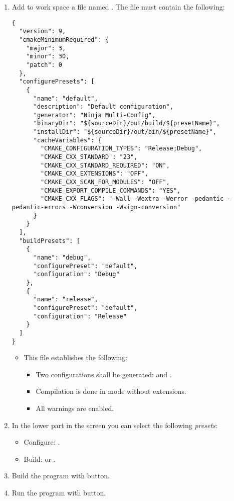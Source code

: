 \begin{enumerate}
\item
Add to work space a file named
. 
The file must contain the following:

\begin{lstlisting}
{
  "version": 9,
  "cmakeMinimumRequired": {
    "major": 3,
    "minor": 30,
    "patch": 0
  },
  "configurePresets": [
    {
      "name": "default",
      "description": "Default configuration",
      "generator": "Ninja Multi-Config",
      "binaryDir": "${sourceDir}/out/build/${presetName}",
      "installDir": "${sourceDir}/out/bin/${presetName}",
      "cacheVariables": {
        "CMAKE_CONFIGURATION_TYPES": "Release;Debug",
        "CMAKE_CXX_STANDARD": "23",
        "CMAKE_CXX_STANDARD_REQUIRED": "ON",
        "CMAKE_CXX_EXTENSIONS": "OFF",
        "CMAKE_CXX_SCAN_FOR_MODULES": "OFF",
        "CMAKE_EXPORT_COMPILE_COMMANDS": "YES",
        "CMAKE_CXX_FLAGS": "-Wall -Wextra -Werror -pedantic -pedantic-errors -Wconversion -Wsign-conversion"
      }
    }
  ],
  "buildPresets": [
    {
      "name": "debug",
      "configurePreset": "default",
      "configuration": "Debug"
    },
    {
      "name": "release",
      "configurePreset": "default",
      "configuration": "Release"
    }
  ]
}
\end{lstlisting}

  \begin{itemize}
    \item This file establishes the following:
      \begin{itemize}
        \item Two configurations shall be generated:
               and .
        \item Compilation is done in  mode without extensions.
        \item All warnings are enabled.
      \end{itemize}
  \end{itemize}

\item 
In the lower part in the screen you can select the following 
      \emph{presets}:
  \begin{itemize}
    \item Configure: .
    \item Build:  or .
  \end{itemize}

\item
Build the program with  button.

\item
Run the program with  button. 

\end{enumerate}

